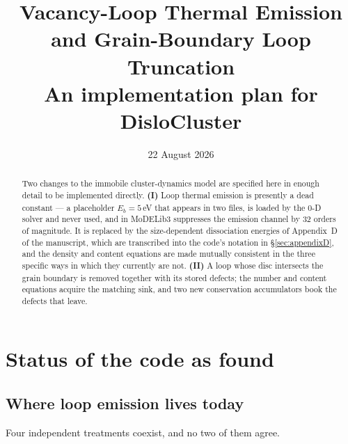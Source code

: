 \documentclass[11pt]{article}
\title{Vacancy-Loop Thermal Emission and Grain-Boundary Loop Truncation\\
       \large An implementation plan for \textsf{DisloCluster}}
\author{}
\date{22 August 2026}
\newcommand{\MoD}{\textsf{MoDELib3}}
\begin{document}
\maketitle

\begin{abstract}
Two changes to the immobile cluster-dynamics model are specified here in
enough detail to be implemented directly.  \textbf{(I)} Loop thermal emission
is presently a dead constant --- a placeholder $E_b=5\,$eV that appears in two
files, is loaded by the 0-D solver and never used, and in \MoD{} suppresses
the emission channel by 32 orders of magnitude.  It is replaced by the
size-dependent dissociation energies of Appendix~D of the manuscript, which
are transcribed into the code's notation in \S\ref{sec:appendixD}, and the
density and content equations are made mutually consistent in the three
specific ways in which they currently are not.  \textbf{(II)} A loop whose
disc intersects the grain boundary is removed together with its stored
defects; the number and content equations acquire the matching sink, and two
new conservation accumulators book the defects that leave.
\end{abstract}

\tableofcontents

\section{Status of the code as found}

\subsection{Where loop emission lives today}

Four independent treatments coexist, and no two of them agree.
\end{document}

